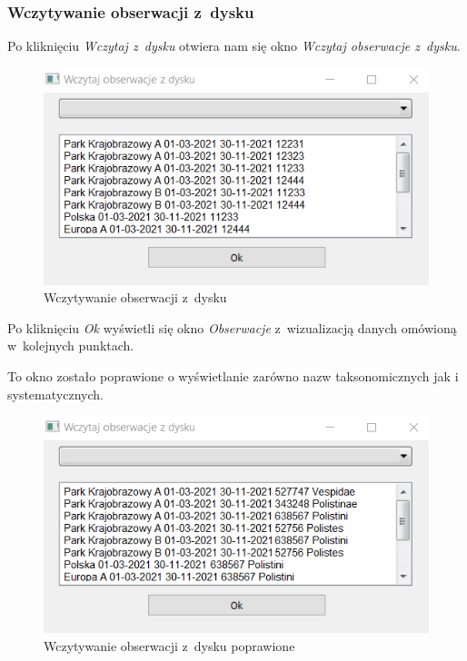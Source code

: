 \documentclass{article}
\begin{document}
\subsubsection{Wczytywanie obserwacji z~dysku} Po kliknięciu \textit{Wczytaj z~dysku} otwiera nam się okno \textit{Wczytaj obserwacje z~dysku}. 

\begin{figure}[h] 
\begin{center}
\includegraphics[scale = 1]{"wczytajobszdysku.png"}
\end{center}
\caption{Wczytywanie obserwacji z~dysku}
\label{}
\end{figure}

Po kliknięciu \textit{Ok} wyświetli się okno \textit{Obserwacje} z~wizualizacją danych omówioną w~kolejnych punktach.

To okno zostało poprawione o wyświetlanie zarówno nazw taksonomicznych jak i systematycznych.

\begin{figure}[h] 
\begin{center}
\includegraphics[scale = 1]{"wczytajobszdysku1.png"}
\end{center}
\caption{Wczytywanie obserwacji z~dysku poprawione}
\label{}
\end{figure}
\end{document}
